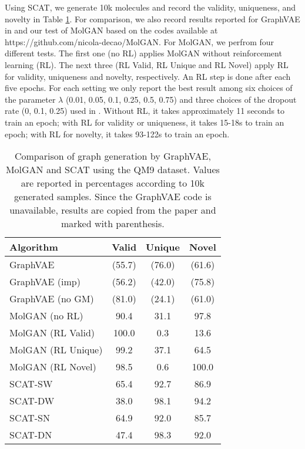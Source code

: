 \documentclass[conference]{IEEEtran}
\begin{document}
Using SCAT, we generate 10k molecules and record the validity, uniqueness, and novelty in Table \ref{tab:molcpr}. For comparison, we also record results reported for GraphVAE in \cite{simonovsky2018graphvae} and our test of MolGAN \cite{de2018molgan} based on the codes available at https://github.com/nicola-decao/MolGAN. For MolGAN, we perfrom four different tests. The first one (no RL) applies MolGAN without reinforcement learning (RL). The next three (RL Valid, RL Unique and RL Novel) apply RL for validity, uniqueness and novelty, respectively. An RL step is done after each five epochs. For each setting we only report the best result among six choices of the parameter $\lambda$ (0.01, 0.05, 0.1, 0.25, 0.5, 0.75) and three choices of the dropout rate (0, 0.1, 0.25) used in \cite{de2018molgan}. Without RL, it takes {approximately 11 seconds} to train an epoch; with RL for validity or uniqueness, it takes 15-18s to train an epoch; with RL for novelty, it takes 93-122s to train an epoch.


\begin{table}[t]
\centering
\caption{Comparison of graph generation by GraphVAE, MolGAN and SCAT using the QM9 dataset. Values are reported in percentages according to 10k generated samples. Since the GraphVAE code is unavailable, results are copied from the paper and marked with parenthesis.}
\begin{tabular}{lccc}
Algorithm & Valid & Unique & Novel \\
\hline
GraphVAE &  (55.7) & (76.0) & (61.6) \\
GraphVAE (imp) & (56.2) & (42.0) & (75.8) \\
GraphVAE (no GM) &  (81.0) & (24.1) & (61.0) \\
\hline
MolGAN (no RL) & 90.4 & 31.1 & 97.8 \\
MolGAN (RL Valid) & 100.0 & 0.3 & 13.6 \\
MolGAN (RL Unique) & 99.2 & 37.1 & 64.5 \\
MolGAN (RL Novel) & 98.5 & 0.6 & 100.0 \\
\hline
{SCAT-SW} & 65.4 & 92.7 & 86.9 \\
{SCAT-DW} & 38.0 & 98.1 & 94.2 \\
{SCAT-SN} & 64.9 & 92.0 & 85.7 \\
{SCAT-DN} & 47.4 & 98.3 & 92.0
\end{tabular}
\label{tab:molcpr}
\end{table}
\end{document}
